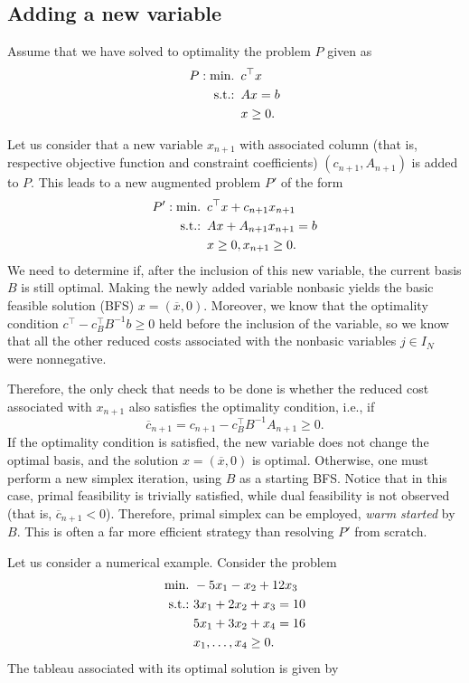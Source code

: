 \subsection{Adding a new variable} \label{section_611}

Assume that we have solved to optimality the problem $P$ given as
%
\begin{align*}
	P : \mathop{\text{min.~}} \, &c^\top x \\
	\mathop{\text{s.t.:~}} \, & Ax = b \\
	& x \geq 0. 	
\end{align*}

Let us consider that a new variable $x_{n+1}$ with associated column (that is, respective objective function and constraint coefficients) $(c_{n+1}, A_{n+1})$ is added to $P$. This leads to a new augmented problem $P'$ of the form
%
\begin{align*}
	P': \mathop{\text{min.~}} \, &c^\top x + c_{n+1}x_{n+1}\\
	\mathop{\text{s.t.:~}} \, & Ax + A_{n+1}x_{n+1}= b \\
	& x \geq 0, x_{n+1} \geq 0. 	
\end{align*}
%
We need to determine if, after the inclusion of this new variable, the current basis $B$ is still optimal. Making the newly added variable nonbasic yields the basic feasible solution (BFS) $x = (\overline{x}, 0)$. Moreover, we know that the optimality condition $c^\top - c_B^\top B^{-1}b \geq 0$ held before the inclusion of the variable, so we know that all the other reduced costs associated with the nonbasic variables $j \in I_N$ were nonnegative. 

Therefore, the only check that needs to be done is whether the reduced cost associated with $x_{n+1}$ also satisfies the optimality condition, i.e., if
%
\begin{equation*}
	\overline{c}_{n+1} = c_{n+1} - c_B^\top B^{-1}A_{n+1} \geq 0.	
\end{equation*}
%
If the optimality condition is satisfied, the new variable does not change the optimal basis, and the solution $x = (\overline{x}, 0)$ is optimal. Otherwise, one must perform a new simplex iteration, using $B$ as a starting BFS. Notice that in this case, primal feasibility is trivially satisfied, while dual feasibility is not observed (that is, $\overline{c}_{n+1} < 0$). Therefore, primal simplex can be employed, \emph{warm started} by $B$. This is often a far more efficient strategy than resolving $P'$ from scratch.

Let us consider a numerical example. Consider the problem
%
\begin{align*}
	\mathop{\text{min.~}} & -5x_1 -x_2 + 12 x_3 \\
	\mathop{\text{s.t.:~}}   & 3x_1 + 2x_2 + x_3 = 10 \\
	& 5x_1 + 3x_2 + x_4 = 16 \\
	& x_1, \dots, x_4 \geq 0.
\end{align*}
%
The tableau associated with its optimal solution is given by

